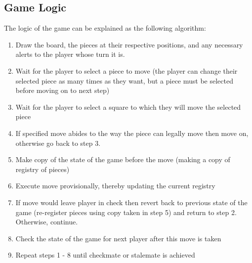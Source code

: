 \documentclass{article}
\begin{document}
\subsection{Game Logic}
The logic of the game can be explained as the following algorithm:
\begin{enumerate}
    \item Draw the board, the pieces at their respective positions, and any necessary alerts to the player whose turn it is.
    
    \item Wait for the player to select a piece to move (the player can change their selected piece as many times as they want, but a piece must be selected before moving on to next step)
    
    \item Wait for the player to select a square to which they will move the selected piece
    
    \item If specified move abides to the way the piece can legally move then move on, otherwise go back to step 3. 
    
    \item Make copy of the state of the game before the move (making a copy of registry of pieces)
    
    \item Execute move provisionally, thereby updating the current registry
    
    \item If move would leave player in check then revert back to previous state of the game (re-register pieces using copy taken in step 5) and return to step 2. Otherwise, continue.
    
    \item Check the state of the game for next player after this move is taken
    
    \item Repeat steps 1 - 8 until checkmate or stalemate is achieved
\end{enumerate}
\end{document}
